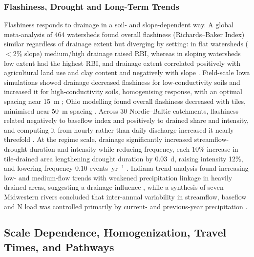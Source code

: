 \documentclass[11pt]{article}
\begin{document}
\subsubsection{Flashiness, Drought and Long-Term Trends}

Flashiness responds to drainage in a soil- and slope-dependent way. A global meta-analysis of 464 watersheds found overall flashiness (Richards--Baker Index) similar regardless of drainage extent but diverging by setting: in flat watersheds ($<$2\% slope) medium/high drainage raised RBI, whereas in sloping watersheds low extent had the highest RBI, and drainage extent correlated positively with agricultural land use and clay content and negatively with slope \parencite{Zhou2025}. Field-scale Iowa simulations showed drainage decreased flashiness for low-conductivity soils and increased it for high-conductivity soils, homogenising response, with an optimal spacing near 15~m \parencite{Sloan2016}; Ohio modelling found overall flashiness decreased with tiles, minimised near 50~m spacing \parencite{Rathore2025}. Across 30 Nordic--Baltic catchments, flashiness related negatively to baseflow index and positively to drained share and intensity, and computing it from hourly rather than daily discharge increased it nearly threefold \parencite{Deelstra2014,Deelstra2014b}. At the regime scale, drainage significantly increased streamflow-drought duration and intensity while reducing frequency, each 10\% increase in tile-drained area lengthening drought duration by 0.03~d, raising intensity 12\%, and lowering frequency 0.10 events~yr$^{-1}$ \parencite{Adelsperger2024}. Indiana trend analysis found increasing low- and medium-flow trends with weakened precipitation linkage in heavily drained areas, suggesting a drainage influence \parencite{Kumar2009}, while a synthesis of seven Midwestern rivers concluded that inter-annual variability in streamflow, baseflow and N load was controlled primarily by current- and previous-year precipitation \parencite{Baeumler2020}.

\subsection{Scale Dependence, Homogenization, Travel Times, and Pathways}
\end{document}
